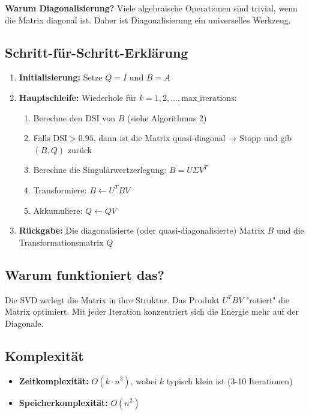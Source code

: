 \documentclass[a4paper,12pt]{article}
\begin{document}
\textbf{Warum Diagonalisierung?} Viele algebraische Operationen sind trivial, wenn die Matrix diagonal ist. Daher ist Diagonalisierung ein universelles Werkzeug.

\subsection{Schritt-für-Schritt-Erklärung}

\begin{enumerate}
\item \textbf{Initialisierung:} Setze $Q = I$ und $B = A$

\item \textbf{Hauptschleife:} Wiederhole für $k = 1, 2, \ldots, \text{max\_iterations}$:

\begin{enumerate}
\item Berechne den DSI von $B$ (siehe Algorithmus 2)

\item Falls $\text{DSI} > 0.95$, dann ist die Matrix quasi-diagonal → Stopp und gib $(B, Q)$ zurück

\item Berechne die Singulärwertzerlegung: $B = U \Sigma V^T$

\item Transformiere: $B \leftarrow U^T B V$

\item Akkumuliere: $Q \leftarrow Q V$
\end{enumerate}

\item \textbf{Rückgabe:} Die diagonalisierte (oder quasi-diagonalisierte) Matrix $B$ und die Transformationsmatrix $Q$
\end{enumerate}

\subsection{Warum funktioniert das?}

Die SVD zerlegt die Matrix in ihre Struktur. Das Produkt $U^T B V$ "rotiert" die Matrix optimiert. Mit jeder Iteration konzentriert sich die Energie mehr auf der Diagonale.

\subsection{Komplexität}

\begin{itemize}
\item \textbf{Zeitkomplexität:} $O(k \cdot n^3)$, wobei $k$ typisch klein ist (3-10 Iterationen)
\item \textbf{Speicherkomplexität:} $O(n^2)$
\end{itemize}
\end{document}
